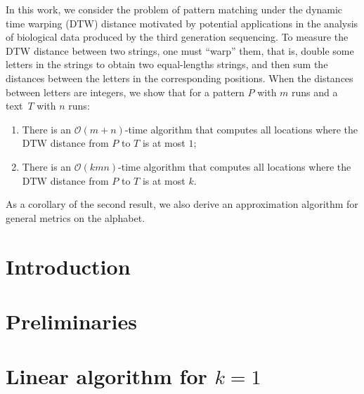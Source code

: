 
\providecommand{\norm}[1]{\ensuremath{\lVert#1\rVert}}
\providecommand{\ceil}[1]{\ensuremath{\lceil#1\rceil}}
\newcommand{\dtw}{\mathrm{DTW}}
\newcommand{\ham}{\mathrm{HAM}}
\providecommand{\dd}{\mathinner{.\,.\allowbreak}}
\providecommand{\RLE}{\mathrm{RLE}}
\providecommand{\Oh}{\mathcal{O}}
\providecommand{\eps}{\varepsilon}
\newcommand{\invacker}{\alpha}

\newcommand{\inputDTW}[1]{}
\newcommand{\figDTW}[2]{\texttt{[image: Part\_Two/dtw/\#2]}}

\begin{small}
In this work, we consider the problem of pattern matching under the dynamic time warping ($\dtw$) distance motivated by potential applications in the analysis of biological data produced by the third generation sequencing. To measure the $\dtw$ distance between two strings, one must ``warp'' them, that is, double some letters in the strings to obtain two equal-lengths strings, and then sum the distances between the letters in the corresponding positions. When the distances between letters are integers, we show that for a pattern $P$ with $m$ runs and a text~$T$ with $n$ runs:
\begin{enumerate}
\item There is an $\Oh(m+n)$-time algorithm that computes all locations where the $\dtw$ distance from $P$ to $T$ is at most $1$;
\item There is an $\Oh(kmn)$-time algorithm that computes all locations where the $\dtw$ distance from $P$ to $T$ is at most $k$.
\end{enumerate}
As a corollary of the second result, we also derive an approximation algorithm for general metrics on the alphabet. 
\end{small}

\section{Introduction}
\inputDTW{intro}

\section{Preliminaries}\label{dtw:sec:prelim}
\inputDTW{prelim}

\section{Linear algorithm for \texorpdfstring{$k=1$}{kone}}
\label{dtw:sec:lce}
\inputDTW{lce}


